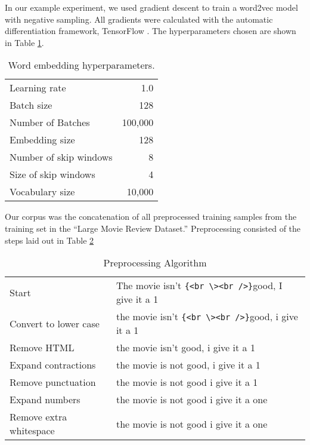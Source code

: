 \label{sec:word_emb_results}
In our example experiment, we used gradient descent to train a word2vec model with negative sampling.  All gradients were calculated with the automatic differentiation framework, TensorFlow \cite{ma16}.  The hyperparameters chosen are shown in Table \ref{tab:embedding_hperparameters}.

\begin{table}[h]
\centering
\begin{tabular}{ l | r }
    \hline
    Learning rate & 1.0 \\
    Batch size & 128 \\
    Number of Batches & 100,000 \\
    Embedding size & 128 \\
    Number of skip windows & 8 \\
    Size of skip windows & 4 \\
    Vocabulary size & 10,000 \\
    \hline
\end{tabular}
\caption{Word embedding hyperparameters.}
\label{tab:embedding_hperparameters}
\end{table}

Our corpus was the concatenation of all preprocessed training samples from the training set in the ``Large Movie Review Dataset.'' \cite{am11}  Preprocessing consisted of the steps laid out in Table \ref{tab:preproc}

\begin{table}[h]
\centering
\begin{tabular}{ l | l }
    \hline
    Start & The movie isn't \verb|{<br \><br />}|good, I give it a 1\\
    Convert to lower case & the movie isn't \verb|{<br \><br />}|good, i give it a 1\\
    Remove HTML & the movie isn't \space good, i give it a 1\\
    Expand contractions & the movie is not \space good, i give it a 1\\
    Remove punctuation & the movie is not \space good i give it a 1\\
    Expand numbers & the movie is not \space good i give it a one\\
    Remove extra whitespace & the movie is not good i give it a one\\
    \hline
\end{tabular}
\caption{Preprocessing Algorithm}
\label{tab:preproc}
\end{table}

